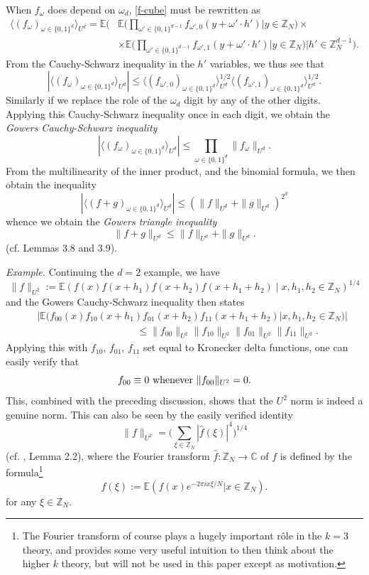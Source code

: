 \documentclass[12pt,a4paper,reqno]{amsart}
\numberwithin{equation}{section}
\theoremstyle{plain}
\theoremstyle{definition}
\renewcommand{\leq}{\leqslant}
\def\Z{{\mathbb Z}}
\def\E{{\mathbb E}}
\def\C{{\mathbb C}}
\def\vs{\vspace{11pt}}
\def\ni{\noindent}
\def\emph#1{{\it #1}}
\begin{document}
\ni When $f_\omega$ does depend on $\omega_d$, \eqref{f-cube} must be rewritten as
\begin{align*}
\langle (f_\omega)_{\omega \in \{0,1\}^d} \rangle_{U^d}
=
\E\bigg(&
\E\big( \prod_{\omega' \in \{0,1\}^{d-1}} f_{\omega',0}(y + \omega' \cdot h') \big| y \in \mathbb{Z}_N\big) \times \\
& \times \E\big( \prod_{\omega' \in \{0,1\}^{d-1}} f_{\omega',1}(y + \omega' \cdot h') \big| y \in \mathbb{Z}_N\big )
\bigg| h' \in \mathbb{Z}_N^{d-1} \bigg).
\end{align*}
From the Cauchy-Schwarz inequality in the $h'$ variables, we thus see that
$$ |\langle (f_\omega)_{\omega \in \{0,1\}^d} \rangle_{U^d}|
\leq \langle (f_{\omega',0})_{\omega \in \{0,1\}^d} \rangle_{U^d}^{1/2}
\langle (f_{\omega',1})_{\omega \in \{0,1\}^d} \rangle_{U^d}^{1/2}.$$
Similarly if we replace the role of the $\omega_d$ digit by any of the other digits.  Applying this Cauchy-Schwarz inequality once in each digit, we obtain the \emph{Gowers Cauchy-Schwarz inequality}
\begin{equation}\label{gcz}
 |\langle (f_\omega)_{\omega \in \{0,1\}^d} \rangle_{U^d}| \leq \prod_{\omega \in \{0,1\}^d} \|f_\omega \|_{U^d}.
\end{equation}
From the multilinearity of the inner product, and the binomial formula, we then obtain the inequality
$$ |\langle (f+g)_{\omega \in \{0,1\}^d} \rangle_{U^d}| \leq (\|f\|_{U^d} + \|g\|_{U^d})^{2^d}$$
whence we obtain the \emph{Gowers triangle inequality}
$$ \| f + g \|_{U^d} \leq \|f\|_{U^d} + \|g\|_{U^d}.$$
(cf. \cite{gowers} Lemmas 3.8 and 3.9).\vs

\ni\textit{Example.} Continuing the $d=2$ example, we have
$$ \|f\|_{U^2} := \E( f(x) f(x+h_1) f(x+h_2) f(x+h_1+h_2) \; | \; x,h_1,h_2 \in \Z_N )^{1/4}$$
and the Gowers Cauchy-Schwarz inequality then states
\begin{eqnarray*} & &  |\E( f_{00}(x) f_{10}(x+h_1) f_{01}(x+h_2) f_{11}(x+h_1+h_2) | x,h_1,h_2 \in \Z_N )| \\ & & \qquad\qquad\qquad\qquad\qquad \leq
\|f_{00} \|_{U^2} \|f_{10} \|_{U^2} \|f_{01} \|_{U^2} \|f_{11} \|_{U^2}.\end{eqnarray*}
Applying this with $f_{10}$, $f_{01}$, $f_{11}$ set equal to Kronecker delta functions, one can easily verify that
$$ f_{00} \equiv 0 \hbox{ whenever } \|f_{00} \|_{U^2} = 0.$$
This, combined with the preceding discussion, shows that the $U^2$ norm is indeed a genuine norm.  This can also be seen by
the easily verified identity
$$ \| f\|_{U^2} = \big(\sum_{\xi \in \mathbb{Z}_N} |\widehat{f}(\xi)|^4\big)^{1/4}$$
(cf. \cite{gowers}, Lemma 2.2), where the Fourier transform $\hat f: \Z_N \to \C$ of $f$ is defined by the formula\footnote{The Fourier
transform of course plays a hugely important r\^ ole in the $k=3$ theory, and provides some
very useful intuition to then think about the higher $k$ theory, but will not be used in this paper except as motivation.}
\[ \widehat{f}(\xi) := \E( f(x) e^{-2\pi i x \xi/N}| x \in \mathbb{Z}_N ).\]
for any $\xi \in \mathbb{Z}_N$. 
\end{document}
